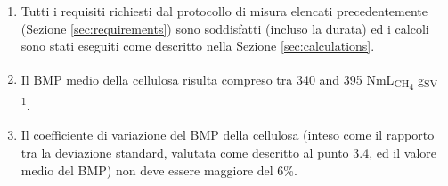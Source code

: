 \documentclass[]{article}
\begin{document}
\begin{enumerate}
  \item Tutti i requisiti richiesti dal protocollo di misura elencati precedentemente (Sezione \ref{sec:requirements}) sono soddisfatti (incluso la durata) ed i calcoli sono stati eseguiti come descritto nella Sezione \ref{sec:calculations}.
  \item Il BMP medio della cellulosa risulta compreso tra 340 and 395 NmL\textsubscript{CH\textsubscript{4}} g\textsubscript{SV}\textsuperscript{-1}.
  \item Il coefficiente di variazione del BMP della cellulosa (inteso come il rapporto tra la deviazione standard, valutata come descritto al punto 3.4, ed il valore medio del BMP) non deve essere maggiore del 6\%.
\end{enumerate}


\end{document}
